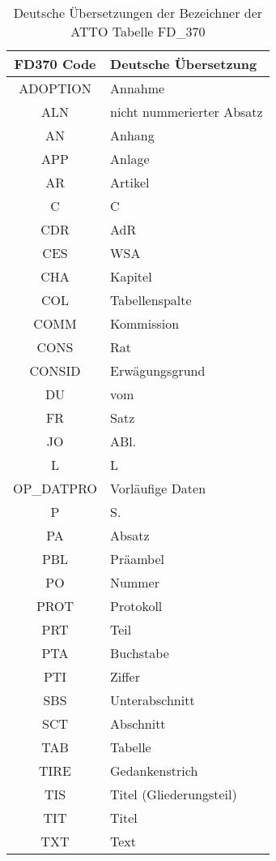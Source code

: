     \begin{table}[H]
        \centering
        \begin{tabular}{|c|l|}\hline
            FD370 Code & Deutsche Übersetzung \\\hline \hline
            ADOPTION & Annahme \\\hline
            ALN & nicht nummerierter Absatz \\\hline
            AN & Anhang \\\hline
            APP & Anlage \\\hline
            AR & Artikel \\\hline
            C & C \\\hline
            CDR & AdR \\\hline
            CES & WSA \\\hline
            CHA & Kapitel \\\hline
            COL & Tabellenspalte \\\hline
            COMM & Kommission \\\hline
            CONS & Rat \\\hline
            CONSID & Erwägungsgrund \\\hline
            DU & vom \\\hline
            FR & Satz \\\hline
            JO & ABl. \\\hline
            L & L \\\hline
            OP\_DATPRO & Vorläufige Daten \\\hline
            P & S. \\\hline
            PA & Absatz \\\hline
            PBL & Präambel \\\hline
            PO & Nummer \\\hline
            PROT & Protokoll \\\hline
            PRT & Teil \\\hline
            PTA & Buchstabe \\\hline
            PTI & Ziffer \\\hline
            SBS & Unterabschnitt \\\hline
            SCT & Abschnitt \\\hline
            TAB & Tabelle \\\hline
            TIRE & Gedankenstrich \\\hline
            TIS & Titel (Gliederungsteil) \\\hline
            TIT & Titel \\\hline
            TXT & Text \\\hline
        \end{tabular}
        \caption{Deutsche Übersetzungen der Bezeichner der ATTO Tabelle FD\_370}
        \label{tab:fd_370}
    \end{table}
    
